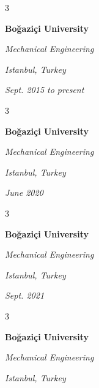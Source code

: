 \documentclass[10pt, letterpaper]{article}
\newenvironment{threecolentry}[3][]{
    \onecolentry
    \def\thirdColumn{#3}
    \setcolumnwidth{0.6 cm, \fill, 4.5 cm}
    \begin{paracol}{3}
    #2 \switchcolumn
}{
    \switchcolumn \raggedleft \thirdColumn
    \end{paracol}
    \endonecolentry
} %
\begin{document}
        \vspace{0.2 cm-3px}

        \begin{threecolentry}{
            \vspace*{\fill}
            \textbullet
            \vspace*{3px}
            \vspace*{\fill}
        }{
        \textit{Istanbul, Turkey}    
            
        \textit{Sept. 2015 to present}}
            \textbf{Boğaziçi University}

            \textit{Mechanical Engineering}
        \end{threecolentry}



        \vspace{0.2 cm-3px}

        \begin{threecolentry}{
            \vspace*{\fill}
            \textbullet
            \vspace*{3px}
            \vspace*{\fill}
        }{
        \textit{Istanbul, Turkey}    
            
        \textit{June 2020}}
            \textbf{Boğaziçi University}

            \textit{Mechanical Engineering}
        \end{threecolentry}



        \vspace{0.2 cm-3px}

        \begin{threecolentry}{
            \vspace*{\fill}
            \textbullet
            \vspace*{3px}
            \vspace*{\fill}
        }{
        \textit{Istanbul, Turkey}    
            
        \textit{Sept. 2021}}
            \textbf{Boğaziçi University}

            \textit{Mechanical Engineering}
        \end{threecolentry}



        \vspace{0.2 cm-3px}

        \begin{threecolentry}{
            \vspace*{\fill}
            \textbullet
            \vspace*{3px}
            \vspace*{\fill}
        }{
        \textit{Istanbul, Turkey}    
            
        }
            \textbf{Boğaziçi University}

            \textit{Mechanical Engineering}
        \end{threecolentry}
\end{document}
